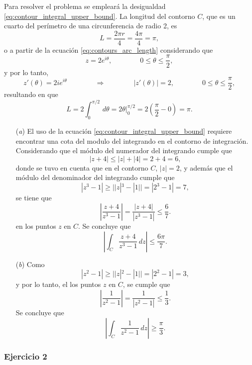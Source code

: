 \documentclass[a4paper]{report}
\begin{document}
Para resolver el problema se empleará la desigualdad \ref{eq:contour_integral_upper_bound}. La longitud del contorno \(C\), que es un cuarto del perímetro de una circunferencia de radio 2, es
\[
 L=\frac{2\pi r}{4}=\frac{4\pi}{4}=\pi,
\]
o a partir de la ecuación \ref{eq:contours_arc_length} considerando que 
\[
 z=2e^{i\theta},
 \qquad\qquad 
 0\leq\theta\leq\frac{\pi}{2},
\]
y por lo tanto,
\[
 z'(\theta)=2ie^{i\theta}
 \qquad\qquad\Rightarrow\qquad\qquad 
 |z'(\theta)|=2,
 \qquad\qquad 
 0\leq\theta\leq\frac{\pi}{2},
\]
resultando en que 
\[
 L=2\int_0^{\pi/2}\,d\theta=2\theta\bigg|_0^{\pi/2}=2\left(\frac{\pi}{2}-0\right)=\pi.
\]
\begin{enumerate}
 \item[(\textit{a})] El uso de la ecuación \ref{eq:contour_integral_upper_bound} requiere encontrar una cota del modulo del integrando en el contorno de integración. Considerando que el módulo del numerador del integrando cumple que
 \[
  |z+4|\leq|z|+|4|=2+4=6,
 \]
 donde se tuvo en cuenta que en el contorno \(C\), \(|z|=2\), y además que el módulo del denominador del integrando cumple que
 \[
  |z^3-1|\geq||z|^3-|1||=|2^3-1|=7,
 \]
 se tiene que 
 \[
  \left|\frac{z+4}{z^3-1}\right|=\frac{|z+4|}{|z^3-1|}\leq\frac{6}{7}.
 \]
 en los puntos \(z\) en \(C\). Se concluye que 
 \[
  \left|\int_C\frac{z+4}{z^3-1}\,dz\right|\leq\frac{6\pi}{7}.
 \]
 \item[(\textit{b})] Como
 \[
  |z^2-1|\geq||z|^2-|1||=|2^2-1|=3,
 \]
 y por lo tanto, el los puntos \(z\) en \(C\), se cumple que 
 \[
  \left|\frac{1}{z^2-1}\right|=\frac{1}{|z^2-1|}\leq\frac{1}{3}.
 \]
 Se concluye que 
 \[
  \left|\int_C\frac{1}{z^2-1}\,dz\right|\geq\frac{\pi}{3}.
 \]
\end{enumerate}

\subsubsection{Ejercicio 2}
 
\end{document}
